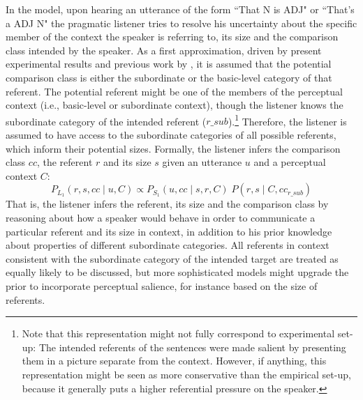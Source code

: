 In the model, upon hearing an utterance of the form ``That N is ADJ" or ``That's a ADJ N" the pragmatic listener tries to resolve his uncertainty about the specific member of the context the speaker is referring to, its size and the comparison class intended by the speaker. As a first approximation, driven by present experimental results and previous work by \textcite{tessler2017warm}, it is assumed that the potential comparison class is either the subordinate or the basic-level category of that referent. The potential referent might be one of the members of the perceptual context (i.e., basic-level or subordinate context), though the listener knows the subordinate category of the intended referent ($r\_{sub}$).\footnote{Note that this representation might not fully correspond to experimental set-up: The intended referents of the sentences were made salient by presenting them in a picture separate from the context. However, if anything, this representation might be seen as more conservative than the empirical set-up, because it generally puts a higher referential pressure on the speaker.} Therefore, the listener is assumed to have access to the subordinate categories of all possible referents, which inform their potential sizes.
Formally, the listener infers the comparison class $cc$, the referent $r$ and its size $s$ given an utterance $u$ and a perceptual context $C$:
\begin{equation}
P_{L_1} (r, s, cc \mid u, C) \propto P_{S_1} (u, cc \mid s, r, C) \; P(r, s \mid C, cc_{r\_sub}) 
\end{equation}
That is, the listener infers the referent, its size and the comparison class by reasoning about how a speaker would behave in order to communicate a particular referent and its size in context, in addition to his prior knowledge about properties of different subordinate categories. All referents in context consistent with the subordinate category of the intended target are treated as equally likely to be discussed, but more sophisticated models might upgrade the prior to incorporate perceptual salience, for instance based on the size of referents. 

